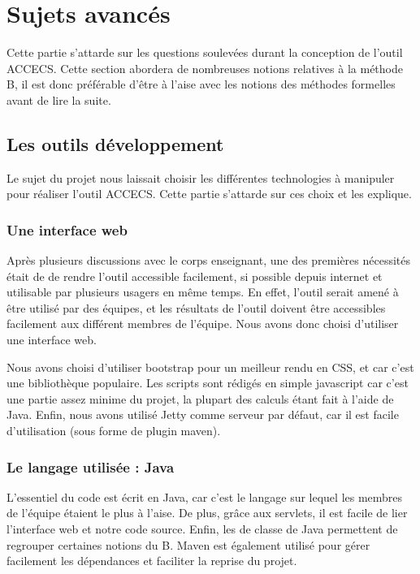 \documentclass[a4paper]{article}
\begin{document}
\newpage{}

\section{Sujets avancés}\label{sec:avance}
    Cette partie s'attarde sur les questions soulevées durant la conception de l'outil ACCECS. Cette section abordera de nombreuses notions relatives à la méthode B, il est donc préférable d'être à l'aise avec les notions des méthodes formelles avant de lire la suite.
    
\subsection{Les outils développement}
	Le sujet du projet nous laissait choisir les différentes technologies à manipuler pour réaliser l'outil ACCECS. Cette partie s'attarde sur ces choix et les explique.
    
\subsubsection{Une interface web}
	Après plusieurs discussions avec le corps enseignant, une des premières nécessités était de de rendre l'outil accessible facilement, si possible depuis internet et utilisable par plusieurs usagers en même temps. En effet, l'outil serait amené à être utilisé par des équipes, et les résultats de l'outil doivent être accessibles facilement aux différent membres de l'équipe. Nous avons donc choisi d'utiliser une interface web.
	
	\bigskip
	
	Nous avons choisi d'utiliser bootstrap pour un meilleur rendu en CSS, et car c'est une bibliothèque populaire. Les scripts sont rédigés en simple javascript car c'est une partie assez minime du projet, la plupart des calculs étant fait à l'aide de Java. Enfin, nous avons utilisé Jetty comme serveur par défaut, car il est facile d'utilisation (sous forme de plugin maven).
	
\subsubsection{Le langage utilisée : Java}
    L'essentiel du code est écrit en Java, car c'est le langage sur lequel les membres de l'équipe étaient le plus à l'aise. De plus, grâce aux servlets, il est facile de lier l'interface web et notre code source. Enfin, les de classe de Java permettent de regrouper certaines notions du B. Maven est également utilisé pour gérer facilement les dépendances et faciliter la reprise du projet.
\end{document}
